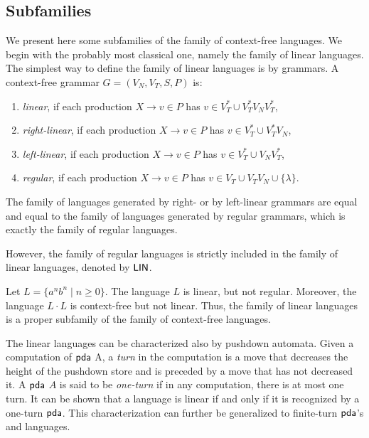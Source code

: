 \subsection{Subfamilies}
\label{subsection:context-free-subfamilies}

We present here some subfamilies of the family of context-free languages. We begin with the probably most classical one, namely the family of linear languages. The simplest way to define the family of linear languages is by grammars. A context-free grammar $G = (V_N, V_T, S, P)$ is:

\begin{enumerate}[]
\item {}\emph{linear}, if each production $X \to v \in P$ has $v \in V_T^* \cup V_T^* V_N V_T^*$,
\item {}\emph{right-linear}, if each production $X \to v \in P$ has $v \in V_T^* \cup V_T^* V_N$,
\item {}\emph{left-linear}, if each production $X \to v \in P$ has $v \in V_T^* \cup V_N V_T^*$,
\item {}\emph{regular}, if each production $X \to v \in P$ has $v \in V_T \cup V_T V_N \cup \{\lambda\}$.
\end{enumerate}

The family of languages generated by right- or by left-linear grammars are equal and equal to the family of languages generated by regular grammars, which is exactly the family of regular languages.

However, the family of regular languages is strictly included in the family of linear languages, denoted by \index{$\Lin$}$\Lin$.

Let $L = \{a^n b^n \mid n \ge 0\}$. The language $L$ is linear, but not regular. Moreover, the language $L \cdot L$ is context-free but not linear. Thus, the family of linear languages is a proper subfamily of the family of context-free languages.

The linear languages can be characterized also by pushdown automata. Given a computation of $\textup{\sf pda}$ A, a \emph{turn} in the computation is a move that decreases the height of the pushdown store and is preceded by a move that has not decreased it. A $\textup{\sf pda}$ $A$ is said to be  \emph{one-turn} if in any computation, there is at most one turn. It can be shown that a language is linear if and only if it is recognized by a one-turn $\textup{\sf pda}$. This characterization can further be generalized to  finite-turn $\textup{\sf pda}$'s and languages.

